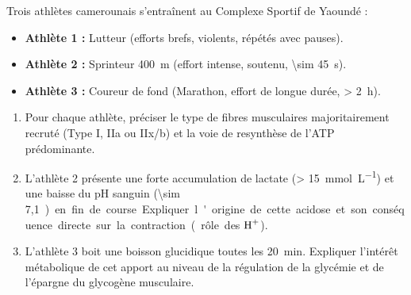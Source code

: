 \documentclass[11pt]{article}
\begin{document}
\begin{exercice}
Trois athlètes camerounais s'entraînent au Complexe Sportif de Yaoundé : 
\begin{itemize}
    \item \textbf{Athlète 1 :} Lutteur (efforts brefs, violents, répétés avec pauses).
    \item \textbf{Athlète 2 :} Sprinteur \SI{400}{\meter} (effort intense, soutenu, \SI{\sim 45}{\second}).
    \item \textbf{Athlète 3 :} Coureur de fond (Marathon, effort de longue durée, \SI{> 2}{\hour}).
\end{itemize}

\begin{enumerate}
    \item Pour chaque athlète, préciser le type de fibres musculaires majoritairement recruté (Type I, IIa ou IIx/b) et la voie de resynthèse de l'ATP prédominante.
    \item L'athlète 2 présente une forte accumulation de lactate (\SI{> 15}{\milli\mol\per\liter}) et une baisse du pH sanguin (\SI{\sim 7,1}) en fin de course. Expliquer l'origine de cette acidose et son conséquence directe sur la contraction (rôle des $\ce{H+}$).
    \item L'athlète 3 boit une boisson glucidique toutes les \SI{20}{\minute}. Expliquer l'intérêt métabolique de cet apport au niveau de la régulation de la glycémie et de l'épargne du glycogène musculaire.
\end{enumerate}
\end{exercice}
\end{document}
